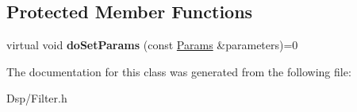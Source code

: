 \subsection*{Protected Member Functions}
\begin{DoxyCompactItemize}
\item 
\hypertarget{classDsp_1_1Filter_ac9a30a3f4b9ce15c5eebf979853b58e6}{virtual void {\bfseries do\-Set\-Params} (const \hyperlink{structDsp_1_1Params}{Params} \&parameters)=0}\label{classDsp_1_1Filter_ac9a30a3f4b9ce15c5eebf979853b58e6}

\end{DoxyCompactItemize}


The documentation for this class was generated from the following file\-:\begin{DoxyCompactItemize}
\item 
Dsp/Filter.\-h\end{DoxyCompactItemize}
